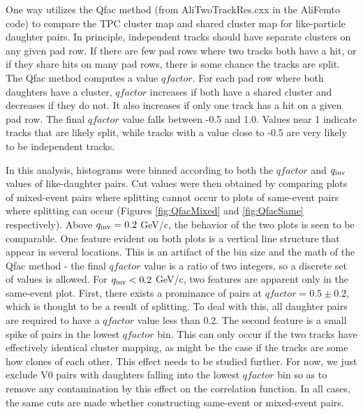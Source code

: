 One way utilizes the Qfac method (from AliTwoTrackRes.cxx in the AliFemto code) to compare the TPC cluster map and shared cluster map for like-particle daughter pairs.  In principle, independent tracks should have separate clusters on any given pad row.  If there are few pad rows where two tracks both have a hit, or  if they share hits on many pad rows, there is some chance the tracks are split. The Qfac method computes a value $qfactor$.  For each pad row where both daughters have a cluster, $qfactor$ increases if both have a shared cluster and decreases if they do not.  It also increases if only one track has a hit on a given pad row.  The final $qfactor$ value falls between -0.5 and 1.0. Values near 1 indicate tracks that are likely split, while tracks with a value close to -0.5 are very likely to be independent tracks.

In this analysis, histograms were binned according to both the $qfactor$ and $q_{\rm inv}$ values of like-daughter pairs.  Cut values were then obtained by comparing plots of mixed-event pairs where splitting cannot occur to plots of same-event pairs where splitting can occur (Figures \ref{fig:QfacMixed} and \ref{fig:QfacSame} respectively).  Above $q_{\rm inv} = 0.2$ GeV/c, the behavior of the two plots is seen to be comparable.  One feature evident on both plots is a vertical line structure that appear in several locations.  This is an artifact of the bin size and the math of the Qfac method - the final $qfactor$ value is a ratio of two integers, so a discrete set of values is allowed.  For $q_{\rm inv} < 0.2$ GeV/c, two features are apparent only in the same-event plot.  First, there exists a prominance of pairs at $qfactor = 0.5 \pm 0.2$, which is thought to be a result of splitting.  To deal with this, all daughter pairs are required to have a $qfactor$ value less than 0.2.  The second feature is a small spike of pairs in the lowest $qfactor$ bin.  This can only occur if the two tracks have effectively identical cluster mapping, as might be the case if the tracks are some how clones of each other.  This effect needs to be studied further.  For now, we just exclude V0 pairs with daughters falling into the lowest $qfactor$ bin so as to remove any contamination by this effect on the correlation function.  In all cases, the same cuts are made whether constructing same-event or mixed-event pairs.

